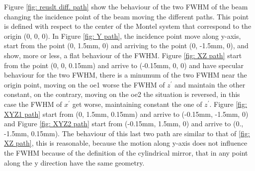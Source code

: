 Figure \ref{fig: reuslt diff. path} show the behaviour of the two FWHM of the beam changing the incidence point of the beam moving the different paths. This point is defined with respect to the center of the Montel system that correspond to the origin (0, 0, 0). In Figure \ref{fig: Y path}, the incidence point move along y-axis, start from the point (0, 1.5mm, 0) and arriving to the point (0, -1.5mm, 0), and show, more or less, a flat behaviour of the FWHM. Figure \ref{fig: XZ path} start from the point (0, 0, 0.15mm) and arrive to (-0.15mm, 0, 0) and have specular behaviour for the two FWHM, there is a minumum of the two FWHM near the origin point, moving on the oe1 worse the FWHM of $z^{'} $ and maintain the other constant, on the contrary, moving on the oe2 the situation is reversed, in this case the FWHM of $x^{'} $ get worse, maintaining constant the one of $z^{'} $. Figure \ref{fig: XYZ1 path} start from (0, 1.5mm, 0.15mm) and arrive to (-0.15mm, -1.5mm, 0) and Figure \ref{fig: XYZ2 path} start from (-0.15mm, 1.5mm, 0) and arrive to (0., -1.5mm, 0.15mm). The behaviour of this last two path are similar to that of \ref{fig: XZ path}, this is reasonable, because the motion along y-axis does not influence the FWHM because of the definition of the cylindrical mirror, that in any point along the y direction have the same geometry.
%
%
